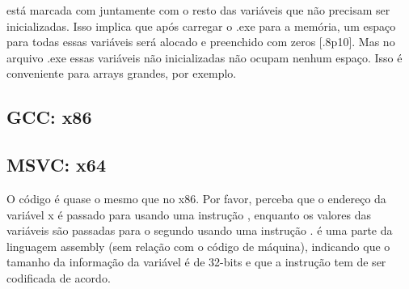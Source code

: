  está marcada com  juntamente com o resto das variáveis que não precisam ser inicializadas.
Isso implica que após carregar o .exe para a memória, um espaço para todas essas variáveis será alocado e preenchido com zeros [.8p10].
Mas no arquivo .exe essas variáveis não inicializadas não ocupam nenhum espaço.
Isso é conveniente para arrays grandes, por exemplo.



\subsection{GCC: x86}

\PTBRph{}

\subsection{MSVC: x64}



O código é quase o mesmo que no x86.
Por favor, perceba que o endereço da variável x é passado para  usando uma instrução \LEA,
enquanto os valores das variáveis são passadas para o segundo \printf usando uma instrução \MOV.
 é uma parte da linguagem assembly (sem relação com o código de máquina),
indicando que o tamanho da informação da variável é de 32-bits e que a instrução \MOV tem de ser codificada de acordo.

